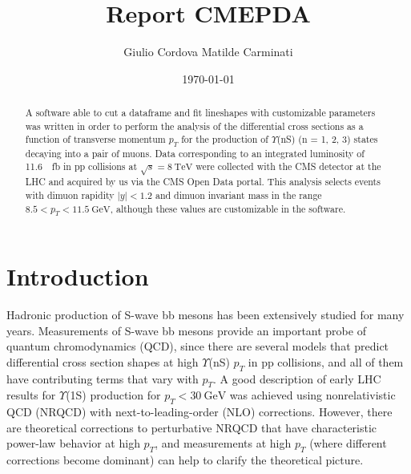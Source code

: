 \documentclass[a4paper,11pt]{article}
\title{Report CMEPDA}
\author{Giulio Cordova \qquad Matilde Carminati}
\date{\today}
\begin{document}
\pagestyle{fancy}
\fancyhead{} %
\fancyfoot{} %
\fancyfoot[CO,RE]{\thepage}
\maketitle
\begin{abstract}
    A software able to cut a dataframe and fit lineshapes with customizable parameters was written in order to perform the analysis of the differential cross sections as a function of transverse momentum $p_T$ for the production of $\Upsilon$(nS) (n = 1, 2, 3) states decaying into a pair of muons. Data corresponding to an integrated luminosity of \SI{11.6}{\per\femto\barn} in pp collisions at $\sqrt{s} = \SI{8}{\tera\eV}$ were collected with the CMS detector at the LHC and acquired by us via the CMS Open Data portal. This analysis selects events with dimuon rapidity $|y| < 1.2$ and dimuon invariant mass in the range $8.5 < p_T < \SI{11.5}{\giga\eV}$, although these values are customizable in the software.

\end{abstract}
\section{Introduction}
Hadronic production of S-wave bb mesons has been extensively studied for many years. 
Measurements of S-wave bb mesons provide an important probe of quantum chromodynamics (QCD), since there are several models that predict differential cross section shapes at high $\Upsilon$(nS) $p_T$ in pp collisions, and all of them have contributing terms that vary with $p_T$.
A good description of early LHC results for $\Upsilon$(1S) production for $p_T < \SI{30}{\giga\eV}$ was achieved using nonrelativistic QCD (NRQCD) with next-to-leading-order (NLO) corrections. However, there are theoretical corrections to perturbative NRQCD that have characteristic power-law behavior at high $p_T$, and measurements at high $p_T$ (where different corrections become dominant) can help to clarify the theoretical picture. 
\end{document}
